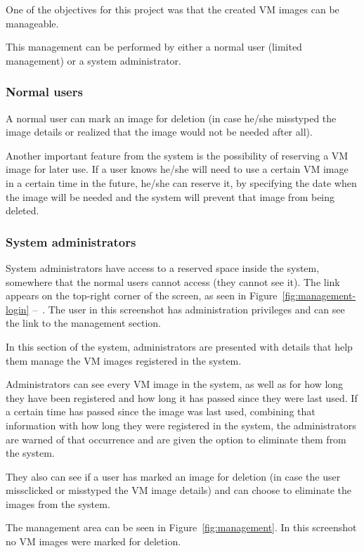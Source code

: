 One of the objectives for this project was that the created VM images can be manageable.

This management can be performed by either a normal user (limited management) or a system administrator.

\subsubsection{Normal users}

A normal user can mark an image for deletion (in case he/she misstyped the image details or realized that the image would not be needed after all).

Another important feature from the system is the possibility of reserving a VM image for later use. If a user knows he/she will need to use a certain VM image in a certain time in the future, he/she can reserve it, by specifying the date when the image will be needed and the system will prevent that image from being deleted.

\subsubsection{System administrators}

System administrators have access to a reserved space inside the system, somewhere that the normal users cannot access (they cannot see it). 
The link appears on the top-right corner of the screen, as seen in Figure~\ref{fig:management-login} --~. The user in this screenshot has administration privileges and can see the link to the management section.

In this section of the system, administrators are presented with details that help them manage the VM images registered in the system.

Administrators can see every VM image in the system, as well as for how long they have been registered and how long it has passed since they were last used. If a certain time has passed since the image was last used, combining that information with how long they were registered in the system, the administrators are warned of that occurrence and are given the option to eliminate them from the system.

They also can see if a user has marked an image for deletion (in case the user missclicked or misstyped the VM image details) and can choose to eliminate the images from the system.

The management area can be seen in Figure~\ref{fig:management}. In this screenshot no VM images were marked for deletion.

